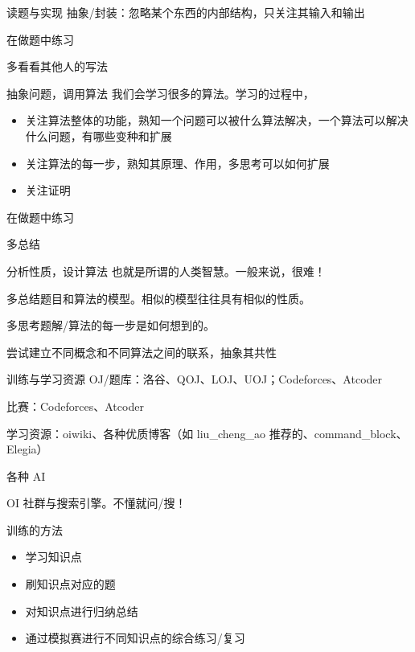 \documentclass[11pt,aspectratio=169]{beamer}
\begin{document}
\begin{frame}{读题与实现}
    抽象/封装：忽略某个东西的内部结构，只关注其输入和输出

    在做题中练习

    多看看其他人的写法
\end{frame}

\begin{frame}{抽象问题，调用算法}
    我们会学习很多的算法。学习的过程中，
    \begin{itemize}
        \item 关注算法整体的功能，熟知一个问题可以被什么算法解决，一个算法可以解决什么问题，有哪些变种和扩展
        \item 关注算法的每一步，熟知其原理、作用，多思考可以如何扩展
        \item 关注证明
    \end{itemize}

    在做题中练习

    多总结
\end{frame}

\begin{frame}{分析性质，设计算法}
    也就是所谓的人类智慧。一般来说，很难！

    多总结题目和算法的模型。相似的模型往往具有相似的性质。

    多思考题解/算法的每一步是如何想到的。

    尝试建立不同概念和不同算法之间的联系，抽象其共性
\end{frame}

\begin{frame}{训练与学习资源}
    OJ/题库：洛谷、QOJ、LOJ、UOJ；Codeforces、Atcoder

    比赛：Codeforces、Atcoder

    学习资源：oiwiki、各种优质博客（如 liu\_cheng\_ao 推荐的、command\_block、Elegia）

    各种 AI

    OI 社群与搜索引擎。不懂就问/搜！
\end{frame}

\begin{frame}{训练的方法}
    \begin{itemize}
        \item 学习知识点
        \item 刷知识点对应的题
        \item 对知识点进行归纳总结
        \item 通过模拟赛进行不同知识点的综合练习/复习
    \end{itemize}
\end{frame}
\end{document}
